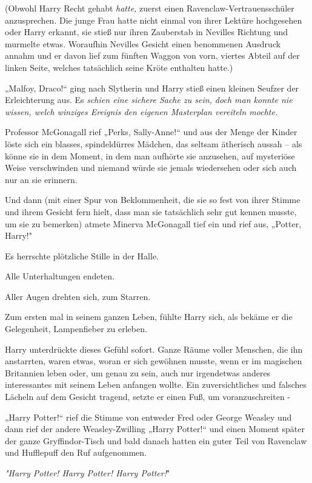 {(Obwohl Harry Recht gehabt \emph{hatte,} zuerst einen Ravenclaw-Vertrauensschüler anzusprechen. Die junge Frau hatte nicht einmal von ihrer Lektüre hochgesehen oder Harry erkannt, sie stieß nur ihren Zauberstab in Nevilles Richtung und murmelte etwas. Woraufhin Nevilles Gesicht einen benommenen Ausdruck annahm und er davon lief zum fünften Waggon von vorn, viertes Abteil auf der linken Seite, welches tatsächlich seine Kröte enthalten hatte.)

„Malfoy, Draco!“ ging nach Slytherin und Harry stieß einen kleinen Seufzer der Erleichterung aus. Es \emph{schien eine sichere Sache zu sein, doch man konnte nie wissen, welch winziges Ereignis den eigenen Masterplan vereiteln mochte.}

Professor McGonagall rief „Perks, Sally-Anne!“ und aus der Menge der Kinder löste sich ein blasses, spindeldürres Mädchen, das seltsam ätherisch aussah -- als könne sie in dem Moment, in dem man aufhörte sie anzusehen, auf mysteriöse Weise verschwinden und niemand würde sie jemals wiedersehen oder sich auch nur an sie erinnern.

Und dann (mit einer Spur von Beklommenheit, die sie so fest von ihrer Stimme und ihrem Gesicht fern hielt, dass man sie tatsächlich sehr gut kennen musste, um sie zu bemerken) atmete Minerva McGonagall tief ein und rief aus, „Potter, Harry!"

Es herrschte plötzliche Stille in der Halle.

Alle Unterhaltungen endeten.

Aller Augen drehten sich, zum Starren.

Zum ersten mal in seinem ganzen Leben, fühlte Harry sich, als bekäme er die Gelegenheit, Lampenfieber zu erleben.

Harry unterdrückte dieses Gefühl sofort. Ganze Räume voller Menschen, die ihn anstarrten, waren etwas, woran er sich gewöhnen musste, wenn er im magischen Britannien leben oder, um genau zu sein, auch nur irgendetwas anderes interessantes mit seinem Leben anfangen wollte. Ein zuversichtliches und falsches Lächeln auf dem Gesicht tragend, setzte er einen Fuß, um voranzuschreiten -

„Harry Potter!“ rief die Stimme von entweder Fred oder George Weasley und dann rief der andere Weasley-Zwilling „Harry Potter!“ und einen Moment später der ganze Gryffindor-Tisch und bald danach hatten ein guter Teil von Ravenclaw und Hufflepuff den Ruf aufgenommen.

\emph{"Harry Potter! Harry Potter! Harry Potter!}"

}
